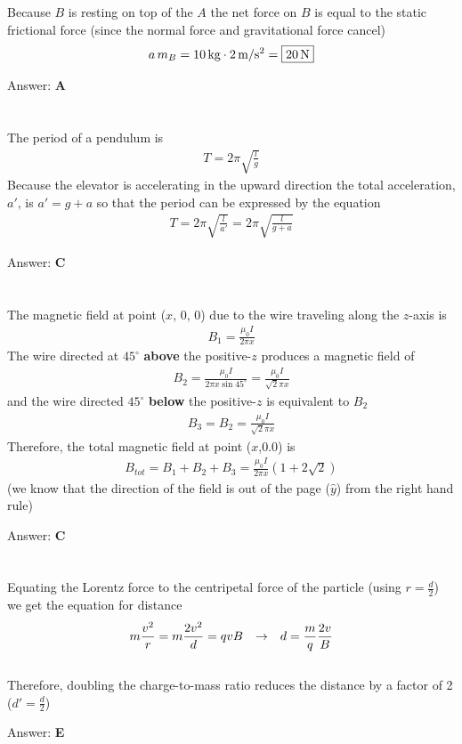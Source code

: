 \documentclass[12pt]{article}
\newcommand{\Answer}[1]{Answer: \textbf{#1}}
\newcommand{\Problem}[3]{
    \setcounter{section}{#1}
    \addtocounter{section}{-1}
    \section{}
    #3\par\par
    \Answer{#2}
}
\begin{document}
\Problem{58}{A}{%
Because $B$ is resting on top of the $A$ the net force on $B$ is equal to the static frictional force (since the normal force and gravitational force cancel)
\begin{align}
a\,m_{B} = 10\,\text{kg} \cdot 2\,\text{m/s$^{2}$} = \boxed{20\,\text{N}}\nonumber
\end{align}
}


\Problem{59}{C}{%
The period of a pendulum is
\begin{align}
T = 2 \pi \sqrt{\frac{l}{g}}
\end{align}
Because the elevator is accelerating in the upward direction the total acceleration, $a'$, is $a' = g + a$ so that the period can be expressed by the equation
\begin{align}
T = 2 \pi \sqrt{\frac{l}{a'}} = \boxed{2 \pi \sqrt{\frac{l}{g + a}}}\nonumber
\end{align}
}


\Problem{60}{C}{%
The magnetic field at point ($x$, $0$, $0$) due to the wire traveling along the $z$-axis is
\begin{align}
B_{1} = \frac{\mu_{0} I}{2 \pi x}
\end{align}
The wire directed at $45^{\circ}$ \textbf{above} the positive-$z$ produces a magnetic field of
\begin{align}
B_{2} = \frac{\mu_{0} I}{2 \pi x \sin{45^{\circ}}} =  \frac{\mu_{0} I}{\sqrt{2} \pi x}\nonumber
\end{align}
and the wire directed $45^{\circ}$ \textbf{below} the positive-$z$ is equivalent to $B_{2}$
\begin{align}
B_{3} = B_{2} =  \frac{\mu_{0} I}{\sqrt{2} \pi x}\nonumber
\end{align}
Therefore, the total magnetic field at point ($x$,$0$.$0$) is
\begin{align}
B_{tot} = B_{1} + B_{2} + B_{3} = \boxed{\frac{\mu_{0} I}{2 \pi x} (1 + 2\sqrt{2})}\nonumber
\end{align}
(we know that the direction of the field is out of the page ($\hat{y}$) from the right hand rule)
}



\Problem{61}{E}{%
Equating the Lorentz force to the centripetal force of the particle (using $r = \frac{d}{2}$) we get the equation for distance
\begin{gather}
m\frac{v^{2}}{r} = m\frac{2v^{2}}{d} = qvB \hspace{.1in} \rightarrow \hspace{.1in} d = \frac{m}{q}\frac{2 v}{B}\nonumber
\end{gather}
\\
Therefore, doubling the charge-to-mass ratio reduces the distance by a factor of 2 ($d' = \frac{d}{2}$)
}
\end{document}
